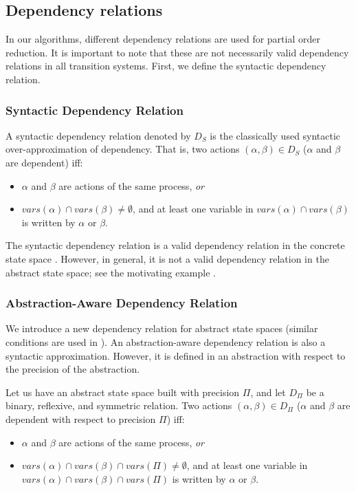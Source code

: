 \documentclass[numbook]{svjour3}
\begin{document}
\subsection{Dependency relations}

In our algorithms, different dependency relations are used for partial order reduction. It is important to note that these are not necessarily valid dependency relations in all transition systems. First, we define the syntactic dependency relation.

\subsubsection{Syntactic Dependency Relation}

A syntactic dependency relation denoted by $D_S$ is the classically used syntactic over-approximation of dependency\cite{godefroid-thesis}. That is, two actions $(\alpha, \beta) \in D_S$ ($\alpha$ and $\beta$ are dependent) iff:

\begin{itemize}
	\item $\alpha$ and $\beta$ are actions of the same process, \emph{or}
	\item ${vars}(\alpha) \cap {vars}(\beta) \ne \emptyset$, and at least one variable in ${vars}(\alpha) \cap {vars}(\beta)$ is written by $\alpha$ or $\beta$.
\end{itemize}

The syntactic dependency relation is a valid dependency relation in the concrete state space \cite{godefroid-thesis}. However, in general, it is not a valid dependency relation in the abstract state space; see the motivating example .

\subsubsection{Abstraction-Aware Dependency Relation}

We introduce a new dependency relation for abstract state spaces (similar conditions are used in \cite{farzan_stratified_commutativity}). An abstraction-aware dependency relation is also a syntactic approximation. However, it is defined in an abstraction with respect to the precision of the abstraction.

\begin{definition}
	Let us have an abstract state space built with precision $\Pi$, and let $D_\Pi$ be a binary, reflexive, and symmetric relation. Two actions $(\alpha, \beta) \in D_\Pi$ ($\alpha$ and $\beta$ are dependent with respect to precision $\Pi$) iff:
	\begin{itemize}
		\item $\alpha$ and $\beta$ are actions of the same process, \emph{or}
		\item ${vars}(\alpha) \cap {vars}(\beta) \cap {vars}(\Pi) \ne \emptyset$, and at least one variable in ${vars}(\alpha) \cap {vars}(\beta) \cap {vars}(\Pi)$ is written by $\alpha$ or $\beta$.
	\end{itemize}
\end{definition}
\end{document}
